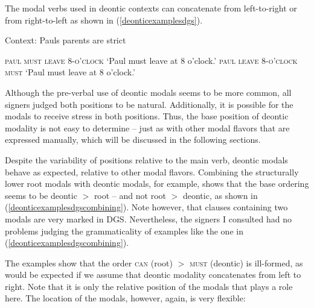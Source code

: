 The modal verbs used in deontic contexts can concatenate from left-to-right or from right-to-left as shown in (\ref{deonticexamplesdgs}). 

\begin{exe}
\ex Context: Pauls parents are strict\label{deonticexamplesdgs}\begin{xlist}
\ex \textsc{paul must leave 8-o'clock}
\glt `Paul must leave at 8 o'clock.'\label{deonticexamplesdgsa}
\ex \textsc{paul leave 8-o'clock must}
\glt `Paul must leave at 8 o'clock.'\label{deonticexamplesdgsb}
\end{xlist}
\end{exe}

\noindent Although the pre-verbal use of deontic modals seems to be more common, all signers judged both positions to be natural. Additionally, it is possible for the modals to receive stress in both positions. Thus, the base position of deontic modality is not easy to determine -- just as with other modal flavors that are expressed manually, which will be discussed in the following sections.

Despite the variability of positions relative to the main verb, deontic modals behave as expected, relative to other modal flavors. Combining the structurally lower root modals with deontic modals, for example, shows that the base ordering seems to be deontic $>$ root -- and not root $>$ deontic, as shown in (\ref{deonticexamplesdgscombining}). Note however, that clauses containing two modals are very marked in DGS. Nevertheless, the signers I consulted had no problems judging the grammaticality of examples like the one in (\ref{deonticexamplesdgscombining}).

\begin{exe}
\ex\label{deonticexamplesdgscombining}\begin{xlist}
\end{xlist}
\end{exe}

\noindent The examples show that the order \textsc{can} (root) $>$ \textsc{must} (deontic) is ill-formed, as would be expected if we assume that deontic modality concatenates from left to right. Note that it is only the relative position of the modals that plays a role here. The location of the modals, however, again, is very flexible:

